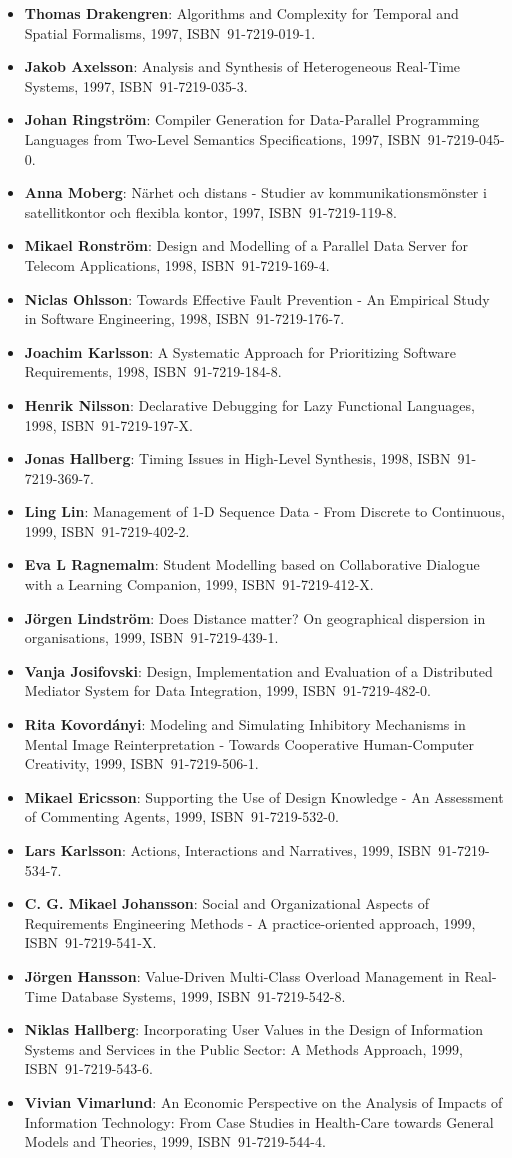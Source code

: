 \documentclass[a4paper,showtrims,twocolumn]{memoir}
\newenvironment{theses}{
  \begin{itemize}
    \setlength{\itemsep}{0.2em}
    \setlength{\parskip}{0em}
    \setlength{\parsep}{0em}
}{
  \end{itemize}
}
\newcommand{\thesis}[5]{\item[No. #1] \textbf{#2}: #3, #4, ISBN~#5.}
\begin{document}
\begin{theses}
    \thesis{498}{Thomas Drakengren}{Algorithms and Complexity for Temporal and Spatial Formalisms}{1997}{91-7219-019-1}
    \thesis{502}{Jakob Axelsson}{Analysis and Synthesis of Heterogeneous Real-Time Systems}{1997}{91-7219-035-3}
    \thesis{503}{Johan Ringström}{Compiler Generation for Data-Parallel Programming Languages from Two-Level Semantics Specifications}{1997}{91-7219-045-0}
    \thesis{512}{Anna Moberg}{Närhet och distans - Studier av kommunikationsmönster i satellitkontor och flexibla kontor}{1997}{91-7219-119-8}
    \thesis{520}{Mikael Ronström}{Design and Modelling of a Parallel Data Server for Telecom Applications}{1998}{91-7219-169-4}
    \thesis{522}{Niclas Ohlsson}{Towards Effective Fault Prevention - An Empirical Study in Software Engineering}{1998}{91-7219-176-7}
    \thesis{526}{Joachim Karlsson}{A Systematic Approach for Prioritizing Software Requirements}{1998}{91-7219-184-8}
    \thesis{530}{Henrik Nilsson}{Declarative Debugging for Lazy Functional Languages}{1998}{91-7219-197-X}
    \thesis{555}{Jonas Hallberg}{Timing Issues in High-Level Synthesis}{1998}{91-7219-369-7}
    \thesis{561}{Ling Lin}{Management of 1-D Sequence Data - From Discrete to Continuous}{1999}{91-7219-402-2}
    \thesis{563}{Eva L Ragnemalm}{Student Modelling based on Collaborative Dialogue with a Learning Companion}{1999}{91-7219-412-X}
    \thesis{567}{Jörgen Lindström}{Does Distance matter? On geographical dispersion in organisations}{1999}{91-7219-439-1}
    \thesis{582}{Vanja Josifovski}{Design, Implementation and Evaluation of a Distributed Mediator System for Data Integration}{1999}{91-7219-482-0}
    \thesis{589}{Rita Kovordányi}{Modeling and Simulating Inhibitory Mechanisms in Mental Image Reinterpretation - Towards Cooperative Human-Computer Creativity}{1999}{91-7219-506-1}
    \thesis{592}{Mikael Ericsson}{Supporting the Use of Design Knowledge - An Assessment of Commenting Agents}{1999}{91-7219-532-0}
    \thesis{593}{Lars Karlsson}{Actions, Interactions and Narratives}{1999}{91-7219-534-7}
    \thesis{594}{C. G. Mikael Johansson}{Social and Organizational Aspects of Requirements Engineering Methods - A practice-oriented approach}{1999}{91-7219-541-X}
    \thesis{595}{Jörgen Hansson}{Value-Driven Multi-Class Overload Management in Real-Time Database Systems}{1999}{91-7219-542-8}
    \thesis{596}{Niklas Hallberg}{Incorporating User Values in the Design of Information Systems and Services in the Public Sector: A Methods Approach}{1999}{91-7219-543-6}
    \thesis{597}{Vivian Vimarlund}{An Economic Perspective on the Analysis of Impacts of Information Technology: From Case Studies in Health-Care towards General Models and Theories}{1999}{91-7219-544-4}

\end{theses}
\end{document}

